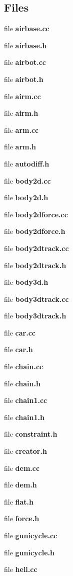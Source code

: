 \subsection*{\-Files}
\begin{DoxyCompactItemize}
\item 
file {\bf airbase.\-cc}
\item 
file {\bf airbase.\-h}
\item 
file {\bf airbot.\-cc}
\item 
file {\bf airbot.\-h}
\item 
file {\bf airm.\-cc}
\item 
file {\bf airm.\-h}
\item 
file {\bf arm.\-cc}
\item 
file {\bf arm.\-h}
\item 
file {\bf autodiff.\-h}
\item 
file {\bf body2d.\-cc}
\item 
file {\bf body2d.\-h}
\item 
file {\bf body2dforce.\-cc}
\item 
file {\bf body2dforce.\-h}
\item 
file {\bf body2dtrack.\-cc}
\item 
file {\bf body2dtrack.\-h}
\item 
file {\bf body3d.\-h}
\item 
file {\bf body3dtrack.\-cc}
\item 
file {\bf body3dtrack.\-h}
\item 
file {\bf car.\-cc}
\item 
file {\bf car.\-h}
\item 
file {\bf chain.\-cc}
\item 
file {\bf chain.\-h}
\item 
file {\bf chain1.\-cc}
\item 
file {\bf chain1.\-h}
\item 
file {\bf constraint.\-h}
\item 
file {\bf creator.\-h}
\item 
file {\bf dem.\-cc}
\item 
file {\bf dem.\-h}
\item 
file {\bf flat.\-h}
\item 
file {\bf force.\-h}
\item 
file {\bf gunicycle.\-cc}
\item 
file {\bf gunicycle.\-h}
\item 
file {\bf heli.\-cc}
\item 

\end{DoxyCompactItemize}
